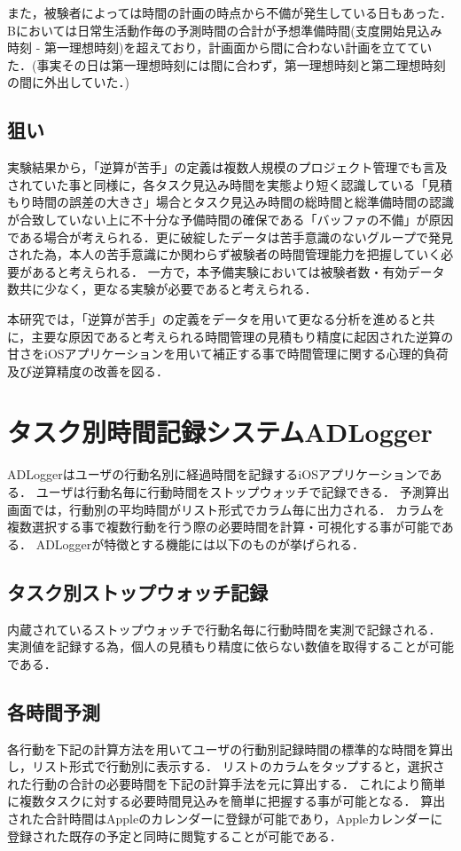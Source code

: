 \documentclass[submit,techrep,noauthor]{ipsj}
\begin{document}
また，被験者によっては時間の計画の時点から不備が発生している日もあった．Bにおいては日常生活動作毎の予測時間の合計が予想準備時間(支度開始見込み時刻 - 第一理想時刻)を超えており，計画面から間に合わない計画を立てていた．(事実その日は第一理想時刻には間に合わず，第一理想時刻と第二理想時刻の間に外出していた．)

\subsection{狙い}
実験結果から，「逆算が苦手」の定義は複数人規模のプロジェクト管理でも言及されていた事と同様に，各タスク見込み時間を実態より短く認識している「見積もり時間の誤差の大きさ」場合とタスク見込み時間の総時間と総準備時間の認識が合致していない上に不十分な予備時間の確保である「バッファの不備」が原因である場合が考えられる．更に破綻したデータは苦手意識のないグループで発見された為，本人の苦手意識にか関わらず被験者の時間管理能力を把握していく必要があると考えられる．
一方で，本予備実験においては被験者数・有効データ数共に少なく，更なる実験が必要であると考えられる．

本研究では，「逆算が苦手」の定義をデータを用いて更なる分析を進めると共に，主要な原因であると考えられる時間管理の見積もり精度に起因された逆算の甘さをiOSアプリケーションを用いて補正する事で時間管理に関する心理的負荷及び逆算精度の改善を図る．


\section{タスク別時間記録システムADLogger}
ADLoggerはユーザの行動名別に経過時間を記録するiOSアプリケーションである．
ユーザは行動名毎に行動時間をストップウォッチで記録できる．
予測算出画面では，行動別の平均時間がリスト形式でカラム毎に出力される．
カラムを複数選択する事で複数行動を行う際の必要時間を計算・可視化する事が可能である．
ADLoggerが特徴とする機能には以下のものが挙げられる．

\subsection{タスク別ストップウォッチ記録}
内蔵されているストップウォッチで行動名毎に行動時間を実測で記録される．
実測値を記録する為，個人の見積もり精度に依らない数値を取得することが可能である．

\subsection{各時間予測}
各行動を下記の計算方法を用いてユーザの行動別記録時間の標準的な時間を算出し，リスト形式で行動別に表示する．
リストのカラムをタップすると，選択された行動の合計の必要時間を下記の計算手法を元に算出する．
これにより簡単に複数タスクに対する必要時間見込みを簡単に把握する事が可能となる．
算出された合計時間はAppleのカレンダーに登録が可能であり，Appleカレンダーに登録された既存の予定と同時に閲覧することが可能である．
\end{document}

